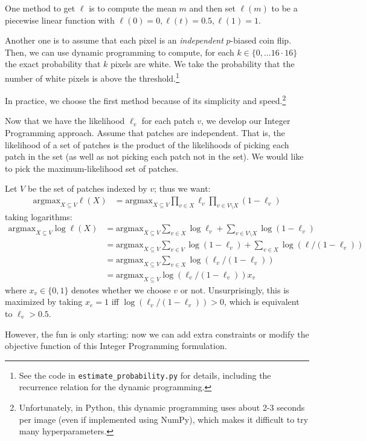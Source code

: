 \documentclass[10pt,conference,compsocconf]{IEEEtran}
\newcommand{\argmax}{\mathrm{argmax}}
\begin{document}
One method to get $\ell$ is to compute the mean $m$ and then set $\ell(m)$ to be a piecewise linear function with $\ell(0) = 0, \ell(t) = 0.5, \ell(1) = 1$.

Another one is to assume that each pixel is an \emph{independent} $p$-biased coin flip. Then, we can use dynamic programming to compute, for each $k \in \{0, ... 16 \cdot 16\}$ the exact probability that $k$ pixels are white. We take the probability that the number of white pixels is above the threshold.\footnote{See the code in \texttt{estimate\_probability.py} for details, including the recurrence relation for the dynamic programming.}

In practice, we choose the first method because of its simplicity and speed.\footnote{Unfortunately, in Python, this dynamic programming uses about 2-3 seconds per image (even if implemented using NumPy), which makes it difficult to try many hyperparameters.}

Now that we have the likelihood $\ell_v$ for each patch $v$, we develop our Integer Programming approach. Assume that patches are independent. That is, the likelihood of a set of patches is the product of the likelihoods of picking each patch in the set (as well as not picking each patch not in the set). We would like to pick the maximum-likelihood set of patches.


Let $V$ be the set of patches indexed by $v$; thus we want:
\begin{align*}
\argmax_{X \subseteq V} \ell(X) &= \argmax_{X \subseteq V} \prod_{v \in X} \ell_v \prod_{v \in V \setminus X} (1 - \ell_v)
\end{align*}
taking logarithms:
\begin{align*}
\argmax_{X \subseteq V} \log \ell(X) &= \argmax_{X \subseteq V} \sum_{v \in X} \log \ell_v + \sum_{v \in V \setminus X} \log (1 - \ell_v) \\
&= \argmax_{X \subseteq V} \sum_{v \in V} \log (1 - \ell_v) + \sum_{v \in X} \log (\ell / (1 - \ell_v)) \\
&= \argmax_{X \subseteq V} \sum_{v \in X} \log (\ell_v / (1 - \ell_v)) \\
&= \argmax_{X \subseteq V} \log (\ell_v / (1 - \ell_v)) x_v
\end{align*}
where $x_v \in \{0,1\}$ denotes whether we choose $v$ or not. Unsurprisingly, this is maximized by taking $x_e = 1$ iff $\log(\ell_v / (1 - \ell_v)) > 0$, which is equivalent to $\ell_v > 0.5$.

However, the fun is only starting: now we can add extra constraints or modify the objective function of this Integer Programming formulation.
\end{document}
